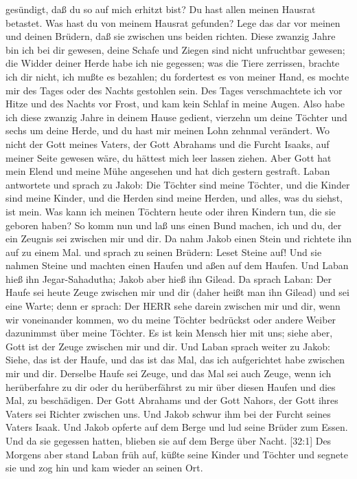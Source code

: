 gesündigt, daß du so auf mich erhitzt bist?  Du hast allen
meinen Hausrat betastet. Was hast du von meinem Hausrat gefunden? Lege
das dar vor meinen und deinen Brüdern, daß sie zwischen uns beiden
richten.  Diese zwanzig Jahre bin ich bei dir gewesen,
deine Schafe und Ziegen sind nicht unfruchtbar gewesen; die Widder
deiner Herde habe ich nie gegessen;  was die Tiere
zerrissen, brachte ich dir nicht, ich mußte es bezahlen; du fordertest
es von meiner Hand, es mochte mir des Tages oder des Nachts gestohlen
sein.  Des Tages verschmachtete ich vor Hitze und des
Nachts vor Frost, und kam kein Schlaf in meine Augen.  Also
habe ich diese zwanzig Jahre in deinem Hause gedient, vierzehn um deine
Töchter und sechs um deine Herde, und du hast mir meinen Lohn zehnmal
verändert.  Wo nicht der Gott meines Vaters, der Gott
Abrahams und die Furcht Isaaks, auf meiner Seite gewesen wäre, du
hättest mich leer lassen ziehen. Aber Gott hat mein Elend und meine Mühe
angesehen und hat dich gestern gestraft.  Laban antwortete
und sprach zu Jakob: Die Töchter sind meine Töchter, und die Kinder sind
meine Kinder, und die Herden sind meine Herden, und alles, was du
siehst, ist mein. Was kann ich meinen Töchtern heute oder ihren Kindern
tun, die sie geboren haben?  So komm nun und laß uns einen
Bund machen, ich und du, der ein Zeugnis sei zwischen mir und dir.
 Da nahm Jakob einen Stein und richtete ihn auf zu einem
Mal.  und sprach zu seinen Brüdern: Leset Steine auf! Und
sie nahmen Steine und machten einen Haufen und aßen auf dem Haufen.
 Und Laban hieß ihn Jegar-Sahadutha; Jakob aber hieß ihn
Gilead.  Da sprach Laban: Der Haufe sei heute Zeuge
zwischen mir und dir (daher heißt man ihn Gilead)  und sei
eine Warte; denn er sprach: Der HERR sehe darein zwischen mir und dir,
wenn wir voneinander kommen,  wo du meine Töchter bedrückst
oder andere Weiber dazunimmst über meine Töchter. Es ist kein Mensch
hier mit uns; siehe aber, Gott ist der Zeuge zwischen mir und dir.
 Und Laban sprach weiter zu Jakob: Siehe, das ist der
Haufe, und das ist das Mal, das ich aufgerichtet habe zwischen mir und
dir.  Derselbe Haufe sei Zeuge, und das Mal sei auch Zeuge,
wenn ich herüberfahre zu dir oder du herüberfährst zu mir über diesen
Haufen und dies Mal, zu beschädigen.  Der Gott Abrahams und
der Gott Nahors, der Gott ihres Vaters sei Richter zwischen uns.
 Und Jakob schwur ihm bei der Furcht seines Vaters Isaak.
Und Jakob opferte auf dem Berge und lud seine Brüder zum Essen. Und da
sie gegessen hatten, blieben sie auf dem Berge über Nacht. 
{[}32:1{]} Des Morgens aber stand Laban früh auf, küßte seine Kinder und
Töchter und segnete sie und zog hin und kam wieder an seinen Ort.

